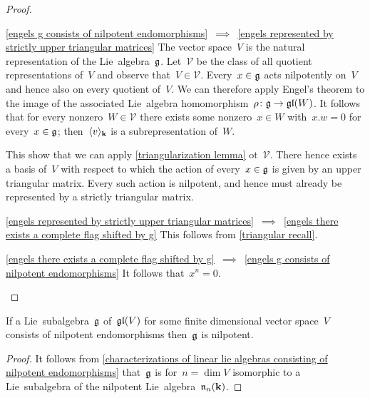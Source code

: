 \begin{proof}
  \leavevmode
  \begin{implicationlist}
    \item[\ref*{engels g consists of nilpotent endomorphisms}~$\implies$~\ref*{engels represented by strictly upper triangular matrices}]
      The vector space~$V$ is the natural representation of the Lie~algebra~$\mathfrak{g}$.
      Let~$\mathcal{V}$ be the class of all quotient representations of~$V$ and observe that~$V \in \mathcal{V}$.
      Every~$x \in \mathfrak{g}$ acts nilpotently on~$V$ and hence also on every quotient of~$V$.
      We can therefore apply Engel’s theorem to the image of the associated Lie~algebra homomorphism~$\rho \colon \mathfrak{g} \to \mathfrak{gl}(W)$.
      It follows that for every nonzero~$W \in \mathcal{V}$ there exists some nonzero~$x \in W$ with~$x.w = 0$ for every~$x \in \mathfrak{g}$;
      then~$\langle v\rangle_{\mathbf{k}}$ is a {\onedimensional} subrepresentation of~$W$.
      
      This show that we can apply \cref{triangularization lemma} ot~$\mathcal{V}$.
      There hence exists a basis of~$V$ with respect to which the action of every~$x \in \mathfrak{g}$ is given by an upper triangular matrix.
      Every such action is nilpotent, and hence must already be represented by a strictly triangular matrix.
    \item[\ref*{engels represented by strictly upper triangular matrices}~$\implies$~\ref*{engels there exists a complete flag shifted by g}]
      This follows from \cref{triangular recall}.
    \item[\ref*{engels there exists a complete flag shifted by g}~$\implies$~\ref*{engels g consists of nilpotent endomorphisms}]
      It follows that~$x^n = 0$.
    \qedhere
  \end{implicationlist}
\end{proof}


\begin{corollary}
  \label{linear lie algebras consisting of nilpotent endomorphisms are nilpotent}
  If a Lie~subalgebra~$\mathfrak{g}$ of~$\mathfrak{gl}(V)$ for some finite dimensional vector space~$V$ consists of nilpotent endomorphisms then~$\mathfrak{g}$ is nilpotent.
\end{corollary}


\begin{proof}
  It follows from \cref{characterizations of linear lie algebras consisting of nilpotent endomorphisms} that~$\mathfrak{g}$ is for~$n = \dim V$ isomorphic to a Lie~subalgebra of the nilpotent Lie~algebra~$\mathfrak{n}_n(\mathbf{k})$.
\end{proof}


